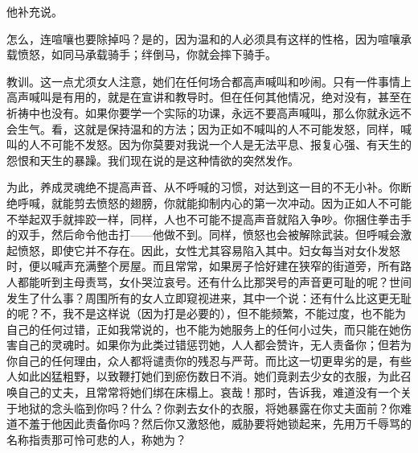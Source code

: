 他补充说。\par

怎么，连喧嚷也要除掉吗？是的，因为温和的人必须具有这样的性格，因为喧嚷承载愤怒，如同马承载骑手；绊倒马，你就会摔下骑手。\par

教训。这一点尤须女人注意，她们在任何场合都高声喊叫和吵闹。只有一件事情上高声喊叫是有用的，就是在宣讲和教导时。但在任何其他情况，绝对没有，甚至在祈祷中也没有。如果你要学一个实际的功课，永远不要高声喊叫，那么你就永远不会生气。看，这就是保持温和的方法；因为正如不喊叫的人不可能发怒，同样，喊叫的人不可能不发怒。因为你莫要对我说一个人是无法平息、报复心强、有天生的怨恨和天生的暴躁。我们现在说的是这种情欲的突然发作。\par

为此，养成灵魂绝不提高声音、从不呼喊的习惯，对达到这一目的不无小补。你断绝呼喊，就能剪去愤怒的翅膀，你就能抑制内心的第一次冲动。因为正如人不可能不举起双手就摔跤一样，同样，人也不可能不提高声音就陷入争吵。你捆住拳击手的双手，然后命令他击打——他做不到。同样，愤怒也会被解除武装。但呼喊会激起愤怒，即使它并不存在。因此，女性尤其容易陷入其中。妇女每当对女仆发怒时，便以喊声充满整个房屋。而且常常，如果房子恰好建在狭窄的街道旁，所有路人都能听到主母责骂，女仆哭泣哀号。还有什么比那哭号的声音更可耻的呢？世间发生了什么事？周围所有的女人立即窥视进来，其中一个说：还有什么比这更无耻的呢？不，我不是这样说（因为打是必要的），但不能频繁，不能过度，也不能为自己的任何过错，正如我常说的，也不能为她服务上的任何小过失，而只能在她伤害自己的灵魂时。如果你为此类过错惩罚她，人人都会赞许，无人责备你；但若为你自己的任何理由，众人都将谴责你的残忍与严苛。而比这一切更卑劣的是，有些人如此凶猛粗野，以致鞭打她们到瘀伤数日不消。她们竟剥去少女的衣服，为此召唤自己的丈夫，且常常将她们绑在床榻上。哀哉！那时，告诉我，难道没有一个关于地狱的念头临到你吗？什么？你剥去女仆的衣服，将她暴露在你丈夫面前？你难道不羞于他因此责备你吗？然后你又激怒他，威胁要将她锁起来，先用万千辱骂的名称指责那可怜可悲的人，称她为？\par

